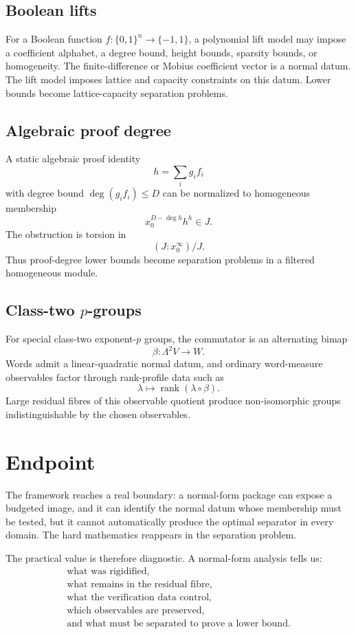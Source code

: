 \documentclass[11pt]{article}
\DeclareMathOperator{\rank}{rank}
\begin{document}
\subsection{Boolean lifts}

For a Boolean function \(f:\{0,1\}^n\to\{-1,1\}\), a polynomial lift model may impose a coefficient alphabet, a degree bound, height bounds, sparsity bounds, or homogeneity. The finite-difference or Mobius coefficient vector is a normal datum. The lift model imposes lattice and capacity constraints on this datum. Lower bounds become lattice-capacity separation problems.

\subsection{Algebraic proof degree}

A static algebraic proof identity
\[
h=\sum_i g_i f_i
\]
with degree bound \(\deg(g_i f_i)\leq D\) can be normalized to homogeneous membership
\[
x_0^{D-\deg h}h^h\in J.
\]
The obstruction is torsion in
\[
(J:x_0^\infty)/J.
\]
Thus proof-degree lower bounds become separation problems in a filtered homogeneous module.

\subsection{Class-two \(p\)-groups}

For special class-two exponent-\(p\) groups, the commutator is an alternating bimap
\[
\beta:\Lambda^2 V\to W.
\]
Words admit a linear-quadratic normal datum, and ordinary word-measure observables factor through rank-profile data such as
\[
\lambda\mapsto \rank(\lambda\circ\beta).
\]
Large residual fibres of this observable quotient produce non-isomorphic groups indistinguishable by the chosen observables.

\section{Endpoint}

The framework reaches a real boundary: a normal-form package can expose a budgeted image, and it can identify the normal datum whose membership must be tested, but it cannot automatically produce the optimal separator in every domain. The hard mathematics reappears in the separation problem.

The practical value is therefore diagnostic. A normal-form analysis tells us:
\[
\begin{gathered}
\text{what was rigidified,}\\
\text{what remains in the residual fibre,}\\
\text{what the verification data control,}\\
\text{which observables are preserved,}\\
\text{and what must be separated to prove a lower bound.}
\end{gathered}
\]
\end{document}
